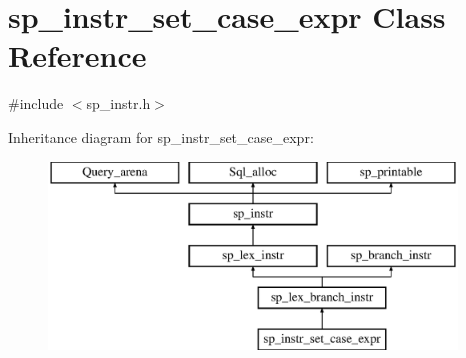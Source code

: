 \hypertarget{classsp__instr__set__case__expr}{}\section{sp\+\_\+instr\+\_\+set\+\_\+case\+\_\+expr Class Reference}
\label{classsp__instr__set__case__expr}


{\ttfamily \#include $<$sp\+\_\+instr.\+h$>$}

Inheritance diagram for sp\+\_\+instr\+\_\+set\+\_\+case\+\_\+expr\+:\begin{figure}[H]
\begin{center}
\leavevmode
\includegraphics[height=5.000000cm]{classsp__instr__set__case__expr}
\end{center}
\end{figure}
